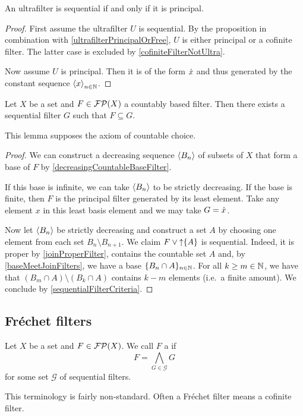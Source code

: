 \begin{corollary}
An ultrafilter is sequential \textup{if and only if} it is principal.
\end{corollary}
\begin{proof}
First assume the ultrafilter $U$ is sequential. By the proposition in combination with \ref{ultrafilterPrincipalOrFree}, $U$ is either principal or a cofinite filter. The latter case is excluded by \ref{cofiniteFilterNotUltra}.

Now assume $U$ is principal. Then it is of the form $\dot{x}$ and thus generated by the constant sequence $\left\langle x \right\rangle_{n\in \mathbb{N}}$.
\end{proof}

\begin{lemma} \label{countablyBasedFilterHasFinerSequential}
Let $X$ be a set and $F\in\operatorname{\mathcal{FP}}(X)$ a countably based filter. Then there exists a sequential filter $G$ such that $F\subseteq G$.
\end{lemma}
This lemma supposes the axiom of countable choice.
\begin{proof}
We can construct a decreasing sequence $\left\langle B_n \right\rangle$ of subsets of $X$ that form a base of $F$ by \ref{decreasingCountableBaseFilter}.

If this base is infinite, we can take $\left\langle B_n \right\rangle$ to be strictly decreasing. If the base is finite, then $F$ is the principal filter generated by its least element. Take any element $x$ in this least basis element and we may take $G = \dot{x}$.

Now let $\left\langle B_n \right\rangle$ be strictly decreasing and construct a set $A$ by choosing one element from each set $B_n\setminus B_{n+1}$. We claim $F\vee \operatorname{\uparrow}\{A\}$ is sequential. Indeed, it is proper by \ref{joinProperFilter}, contains the countable set $A$ and, by \ref{baseMeetJoinFilters}, we have a base $\{B_n\cap A\}_{n\in \mathbb{N}}$. 
For all $k\geq m\in \mathbb{N}$, we have that $(B_m\cap A)\setminus (B_k\cap A)$ contains $k-m$ elements (i.e.\ a finite amount).
We conclude by \ref{sequentialFilterCriteria}.
\end{proof}

\subsection{Fréchet filters}
\begin{definition}
Let $X$ be a set and $F\in\operatorname{\mathcal{FP}}(X)$. We call $F$ a  if
\[ F = \bigwedge_{G\in \mathcal{G}}G \]
for some set $\mathcal{G}$ of sequential filters.
\end{definition}
This terminology is fairly non-standard. Often a Fréchet filter means a cofinite filter.

